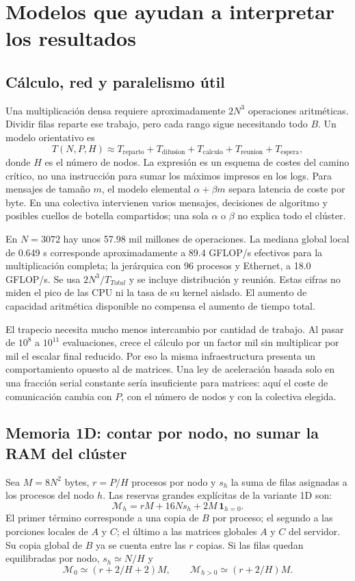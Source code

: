 \section{Modelos que ayudan a interpretar los resultados}\label{sec:modelos}

\subsection{Cálculo, red y paralelismo útil}

Una multiplicación densa requiere aproximadamente $2N^3$ operaciones aritméticas. Dividir filas reparte ese trabajo, pero cada rango sigue necesitando todo $B$. Un modelo orientativo es
\[
 T(N,P,H)\approx T_{\mathrm{reparto}}+T_{\mathrm{difusion}}+
 T_{\mathrm{calculo}}+T_{\mathrm{reunion}}+T_{\mathrm{espera}},
\]
donde $H$ es el número de nodos. La expresión es un esquema de costes del camino crítico, no una instrucción para sumar los máximos impresos en los logs. Para mensajes de tamaño $m$, el modelo elemental $\alpha+\beta m$ separa latencia de coste por byte. En una colectiva intervienen varios mensajes, decisiones de algoritmo y posibles cuellos de botella compartidos; una sola $\alpha$ o $\beta$ no explica todo el clúster.

En $N=3072$ hay unos 57.98 mil millones de operaciones. La mediana global local de 0.649 s corresponde aproximadamente a 89.4 GFLOP/s efectivos para la multiplicación completa; la jerárquica con 96 procesos y Ethernet, a 18.0 GFLOP/s. Se usa $2N^3/T_{Total}$ y se incluye distribución y reunión. Estas cifras no miden el pico de las CPU ni la tasa de su kernel aislado. El aumento de capacidad aritmética disponible no compensa el aumento de tiempo total.

El trapecio necesita mucho menos intercambio por cantidad de trabajo. Al pasar de $10^8$ a $10^{11}$ evaluaciones, crece el cálculo por un factor mil sin multiplicar por mil el escalar final reducido. Por eso la misma infraestructura presenta un comportamiento opuesto al de matrices. Una ley de aceleración basada solo en una fracción serial constante sería insuficiente para matrices: aquí el coste de comunicación cambia con $P$, con el número de nodos y con la colectiva elegida.

\subsection{Memoria 1D: contar por nodo, no sumar la RAM del clúster}

Sea $M=8N^2$ bytes, $r=P/H$ procesos por nodo y $s_h$ la suma de filas asignadas a los procesos del nodo $h$. Las reservas grandes explícitas de la variante 1D son:
\[
 \mathcal M_h=rM+16Ns_h+2M\,\mathbf1_{h=0}.
\]
El primer término corresponde a una copia de $B$ por proceso; el segundo a las porciones locales de $A$ y $C$; el último a las matrices globales $A$ y $C$ del servidor. Su copia global de $B$ ya se cuenta entre las $r$ copias. Si las filas quedan equilibradas por nodo, $s_h\simeq N/H$ y
\[
 \mathcal M_0\simeq(r+2/H+2)M,\qquad
 \mathcal M_{h>0}\simeq(r+2/H)M.
\]

